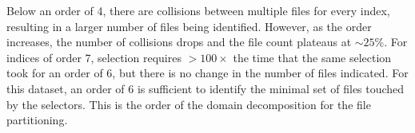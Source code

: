 \documentclass[apjl]{emulateapj}
\begin{document}
Below an order of 4, there are collisions between multiple files for every index, resulting in a larger number of files being identified. However, as the order increases, the number of collisions drops and the file count plateaus at $\sim25$\%. For indices of order 7, selection requires $>100\times$ the time that the same selection took for an order of 6, but there is no change in the number of files indicated. For this dataset, an order of 6 is sufficient to identify the minimal set of files touched by the selectors. This is the order of the domain decomposition for the file partitioning.


\end{document}

